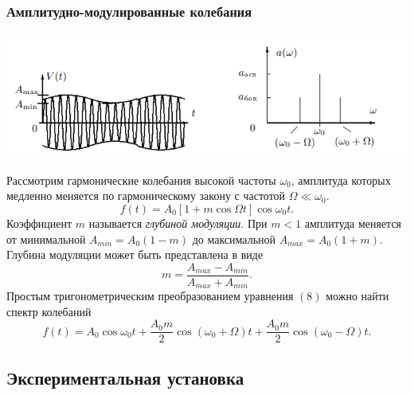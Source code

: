 \documentclass[12pt,a4paper]{article}
\begin{document}
\subsubsection*{Амплитудно-модулированные колебания}
\begin{center}
\includegraphics[scale=0.9]{s3.png}
\end{center}
Рассмотрим гармонические колебания высокой частоты $\omega_0$, амплитуда которых медленно меняется по гармоническому закону с частотой $\Omega \ll \omega_0$.
\begin{equation}
f(t) = A_0 \left[1+m\cos \Omega t\right] \cos \omega_0 t.
\end{equation}
Коэффициент $m$ называется \textit{глубиной модуляции}. При $m < 1$ амплитуда меняется от минимальной $A_{min} = A_0(1-m)$ до максимальной $A_{max} = A_0(1+m)$. Глубина модуляции может быть представлена в виде
\begin{equation}
m = \dfrac{A_{max}-A_{min}}{A_{max}+A_{min}}.
\end{equation}
Простым тригонометрическим преобразованием уравнения $(8)$ можно найти спектр колебаний
\begin{equation}
f(t) = A_0 \cos \omega_0t + \dfrac{A_0m}{2} \cos \left(\omega_0 + \Omega\right)t + \dfrac{A_0m}{2}\cos\left(\omega_0 - \Omega\right)t.
\end{equation}

\subsection*{Экспериментальная установка}
\end{document}
